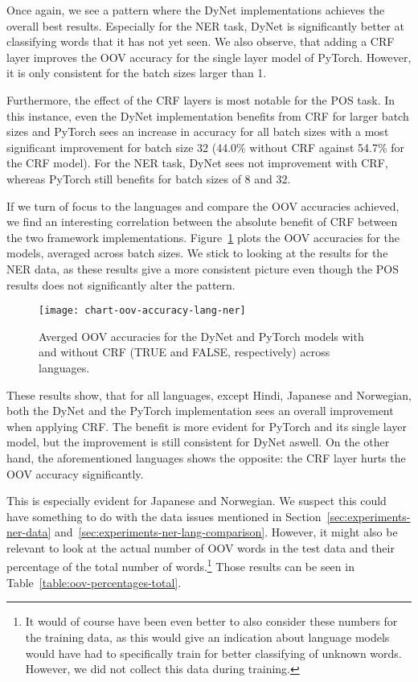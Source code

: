 Once again, we see a pattern where the DyNet implementations achieves the
overall best results. Especially for the NER task, DyNet is significantly
better at classifying words that it has not yet seen. We also observe, that
adding a CRF layer improves the OOV accuracy for the single layer model of
PyTorch. However, it is only consistent for the batch sizes larger than 1.

Furthermore, the effect of the CRF layers is most notable for the POS task.
In this instance, even the DyNet implementation benefits from CRF for larger
batch sizes and PyTorch sees an increase in accuracy for all batch sizes with a
most significant improvement for batch size 32 (44.0\% without CRF against
54.7\% for the CRF model). For the NER task, DyNet sees not improvement with
CRF, whereas PyTorch still benefits for batch sizes of 8 and 32.

If we turn of focus to the languages and compare the OOV accuracies achieved, we
find an interesting correlation between the absolute benefit of CRF between the
two framework implementations. Figure~\ref{chart:oov-accuracy-lang-ner} plots
the OOV accuracies for the models, averaged across batch sizes. We stick to
looking at the results for the NER data, as these results give a more consistent
picture even though the POS results does not significantly alter the pattern.

\begin{figure}[h!]
    \texttt{[image: chart-oov-accuracy-lang-ner]}
    \caption{Averged OOV accuracies for the DyNet and PyTorch models with and
        without CRF (TRUE and FALSE, respectively) across languages.
    }\label{chart:oov-accuracy-lang-ner}
\end{figure}

These results show, that for all languages, except Hindi, Japanese and
Norwegian, both the DyNet and the PyTorch implementation sees an overall
improvement when applying CRF. The benefit is more evident for PyTorch and its
single layer model, but the improvement is still consistent for DyNet aswell. On
the other hand, the aforementioned languages shows the opposite: the CRF layer
hurts the OOV accuracy significantly.

This is especially evident for Japanese and Norwegian. We suspect this could
have something to do with the data issues mentioned in
Section~\ref{sec:experiments-ner-data}
and~\ref{sec:experiments-ner-lang-comparison}. However, it might also be
relevant to look at the actual number of OOV words in the test data and their
percentage of the total number of words.\footnote{It would of course have been
    even better to also consider these numbers for the training data, as this
    would give an indication about language models would have had to
    specifically train for better classifying of unknown words. However, we did
not collect this data during training.} Those results can be seen in
Table~\ref{table:oov-percentages-total}.

